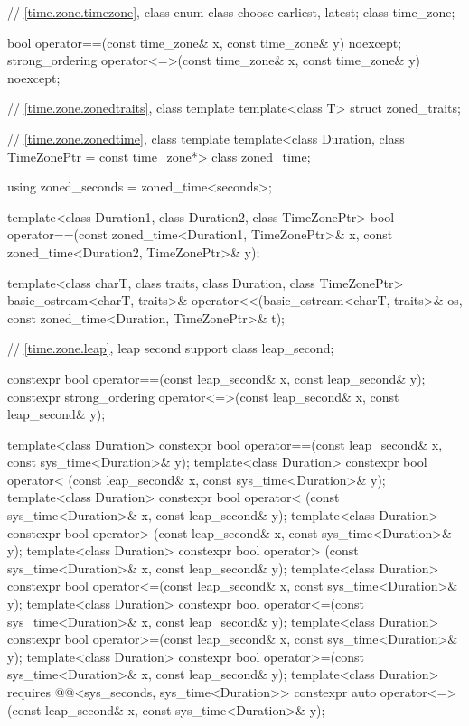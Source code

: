 \begin{codeblock}
{  // \ref{time.zone.timezone}, class 
  enum class choose {earliest, latest};
  class time_zone;

  bool operator==(const time_zone& x, const time_zone& y) noexcept;
  strong_ordering operator<=>(const time_zone& x, const time_zone& y) noexcept;

  // \ref{time.zone.zonedtraits}, class template 
  template<class T> struct zoned_traits;

  // \ref{time.zone.zonedtime}, class template 
  template<class Duration, class TimeZonePtr = const time_zone*> class zoned_time;

  using zoned_seconds = zoned_time<seconds>;

  template<class Duration1, class Duration2, class TimeZonePtr>
    bool operator==(const zoned_time<Duration1, TimeZonePtr>& x,
                    const zoned_time<Duration2, TimeZonePtr>& y);

  template<class charT, class traits, class Duration, class TimeZonePtr>
    basic_ostream<charT, traits>&
      operator<<(basic_ostream<charT, traits>& os,
                 const zoned_time<Duration, TimeZonePtr>& t);

  // \ref{time.zone.leap}, leap second support
  class leap_second;

  constexpr bool operator==(const leap_second& x, const leap_second& y);
  constexpr strong_ordering operator<=>(const leap_second& x, const leap_second& y);

  template<class Duration>
    constexpr bool operator==(const leap_second& x, const sys_time<Duration>& y);
  template<class Duration>
    constexpr bool operator< (const leap_second& x, const sys_time<Duration>& y);
  template<class Duration>
    constexpr bool operator< (const sys_time<Duration>& x, const leap_second& y);
  template<class Duration>
    constexpr bool operator> (const leap_second& x, const sys_time<Duration>& y);
  template<class Duration>
    constexpr bool operator> (const sys_time<Duration>& x, const leap_second& y);
  template<class Duration>
    constexpr bool operator<=(const leap_second& x, const sys_time<Duration>& y);
  template<class Duration>
    constexpr bool operator<=(const sys_time<Duration>& x, const leap_second& y);
  template<class Duration>
    constexpr bool operator>=(const leap_second& x, const sys_time<Duration>& y);
  template<class Duration>
    constexpr bool operator>=(const sys_time<Duration>& x, const leap_second& y);
  template<class Duration>
    requires @@<sys_seconds, sys_time<Duration>>
    constexpr auto operator<=>(const leap_second& x, const sys_time<Duration>& y);

}
\end{codeblock}

